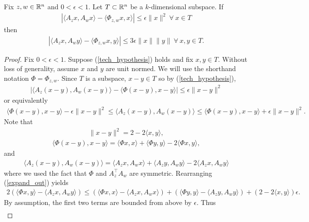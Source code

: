 \documentclass{article}
\begin{document}
\begin{prop} Fix $z,w \in \mathbb{R}^n$ and $0 < \epsilon < 1$. Let $T \subset \mathbb{R}^n$ be a $k$-dimensional subspace. If \begin{align}
\left|\langle  A_z x, A_w x\rangle - \langle \Phi_{z,w} x, x\rangle\right| \leq \epsilon \|x\|^2\ \forall\ x \in T \label{tech_hypothesis}
\end{align} then \begin{align*}
\left|\langle  A_z x, A_w y\rangle - \langle \Phi_{z,w} x, y\rangle\right| \leq 3\epsilon\|x\|\|y\|\ \forall\ x,y \in T.
\end{align*}
\end{prop}

\begin{proof} Fix $0 < \epsilon < 1$. Suppose (\ref{tech_hypothesis}) holds and fix $x,y \in T$. Without loss of generality, assume $x$ and $y$ are unit normed. We will use the shorthand notation $\Phi = \Phi_{z,w}$. Since $T$ is a subspace, $x - y \in T$ so by (\ref{tech_hypothesis}), \begin{align*}
\left|\langle  A_z (x - y), A_w(x-y)\rangle - \langle \Phi (x-y), x-y\rangle\right| \leq \epsilon\|x-y\|^2
\end{align*} or equivalently \begin{align}
\langle \Phi (x-y), x-y\rangle - \epsilon \|x-y\|^2 \leq \langle  A_z (x - y), A_w(x-y)\rangle  \leq \langle \Phi (x-y), x-y\rangle + \epsilon \|x-y\|^2. \label{expand_out}
\end{align} Note that \begin{align*}
\|x-y\|^2 = 2 - 2\langle x,y\rangle,
\end{align*} \begin{align*}
\langle \Phi (x-y), x-y\rangle = \langle \Phi x,x\rangle + \langle \Phi y,y\rangle - 2\langle \Phi x,y\rangle,
\end{align*} and \begin{align*}
\langle  A_z (x - y), A_w(x-y)\rangle = \langle A_z x, A_w x\rangle + \langle A_z y, A_w y\rangle - 2 \langle A_z x, A_w y\rangle
\end{align*} where we used the fact that $\Phi$ and $A_z^\top A_w$ are symmetric. Rearranging (\ref{expand_out}) yields \begin{align*}
2 \left(\langle \Phi x,y \rangle - \langle A_z x, A_w y \rangle\right) \leq \left(\langle \Phi x, x\rangle - \langle  A_z x , A_w x\rangle\right) + \left(\langle \Phi  y, y\rangle - \langle  A_z y, A_w y\rangle\right) + (2 - 2\langle x,y \rangle)\epsilon.
\end{align*} By assumption, the first two terms are bounded from above by $\epsilon$. Thus \begin{align*}

\end{align*}
\end{proof}
\end{document}
